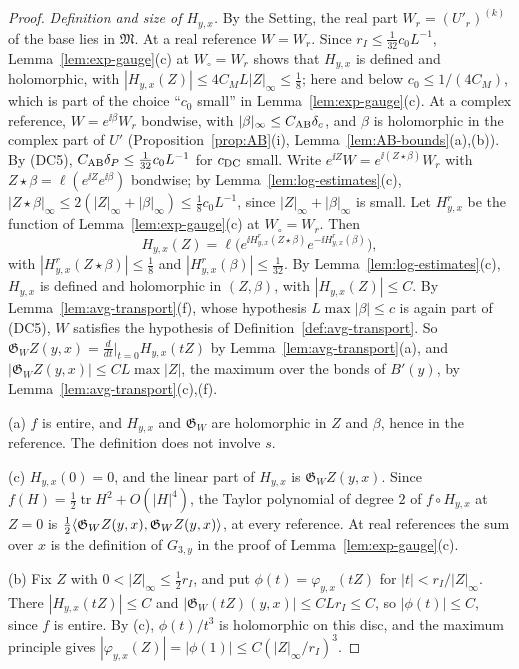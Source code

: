 \begin{proof}
\emph{Definition and size of $H_{y,x}$.} By the Setting, the real part $W_r=(U'_r)^{(k)}$ of the base lies in $\mathfrak M$. At a real reference $W=W_r$. Since $r_I\le\frac1{32}c_0L^{-1}$, Lemma~\ref{lem:exp-gauge}(c) at $W_\circ=W_r$ shows that $H_{y,x}$ is defined and holomorphic, with $|H_{y,x}(Z)|\le4C_ML|Z|_\infty\le\frac18$; here and below $c_0\le1/(4C_M)$, which is part of the choice ``$c_0$ small'' in Lemma~\ref{lem:exp-gauge}(c). At a complex reference, $W=e^{\ii\beta}W_r$ bondwise, with $|\beta|_\infty\le C_{\rm AB}\delta_c$, and $\beta$ is holomorphic in the complex part of $U'$ (Proposition~\ref{prop:AB}(i), Lemma~\ref{lem:AB-bounds}(a),(b)). By (DC5), $C_{\rm AB}\delta_P\le\frac1{32}c_0L^{-1}$ for $c_{\rm DC}$ small. Write $e^{\ii Z}W=e^{\ii(Z\star\beta)}W_r$ with $Z\star\beta=\ell(e^{\ii Z}e^{\ii\beta})$ bondwise; by Lemma~\ref{lem:log-estimates}(c), $|Z\star\beta|_\infty\le2(|Z|_\infty+|\beta|_\infty)\le\frac18c_0L^{-1}$, since $|Z|_\infty+|\beta|_\infty$ is small. Let $H^r_{y,x}$ be the function of Lemma~\ref{lem:exp-gauge}(c) at $W_\circ=W_r$. Then
\[
H_{y,x}(Z)=\ell\big(e^{\ii H^r_{y,x}(Z\star\beta)}e^{-\ii H^r_{y,x}(\beta)}\big),
\]
with $|H^r_{y,x}(Z\star\beta)|\le\frac18$ and $|H^r_{y,x}(\beta)|\le\frac1{32}$. By Lemma~\ref{lem:log-estimates}(c), $H_{y,x}$ is defined and holomorphic in $(Z,\beta)$, with $|H_{y,x}(Z)|\le C$. By Lemma~\ref{lem:avg-transport}(f), whose hypothesis $L\max|\beta|\le c$ is again part of (DC5), $W$ satisfies the hypothesis of Definition~\ref{def:avg-transport}. So $\mathfrak G_WZ(y,x)=\frac d{dt}\big|_{t=0}H_{y,x}(tZ)$ by Lemma~\ref{lem:avg-transport}(a), and $|\mathfrak G_WZ(y,x)|\le CL\max|Z|$, the maximum over the bonds of $B'(y)$, by Lemma~\ref{lem:avg-transport}(c),(f).

(a) $f$ is entire, and $H_{y,x}$ and $\mathfrak G_W$ are holomorphic in $Z$ and $\beta$, hence in the reference. The definition does not involve $s$.

(c) $H_{y,x}(0)=0$, and the linear part of $H_{y,x}$ is $\mathfrak G_WZ(y,x)$. Since $f(H)=\frac12\operatorname{tr}H^2+O(|H|^4)$, the Taylor polynomial of degree $2$ of $f\circ H_{y,x}$ at $Z=0$ is $\frac12\langle \mathfrak G_WZ(y,x),\mathfrak G_WZ(y,x)\rangle$, at every reference. At real references the sum over $x$ is the definition of $G_{3,y}$ in the proof of Lemma~\ref{lem:exp-gauge}(c).

(b) Fix $Z$ with $0<|Z|_\infty\le\frac12r_I$, and put $\phi(t)=\varphi_{y,x}(tZ)$ for $|t|<r_I/|Z|_\infty$. There $|H_{y,x}(tZ)|\le C$ and $|\mathfrak G_W(tZ)(y,x)|\le CLr_I\le C$, so $|\phi(t)|\le C$, since $f$ is entire. By (c), $\phi(t)/t^3$ is holomorphic on this disc, and the maximum principle gives $|\varphi_{y,x}(Z)|=|\phi(1)|\le C(|Z|_\infty/r_I)^3$.


\end{proof}

